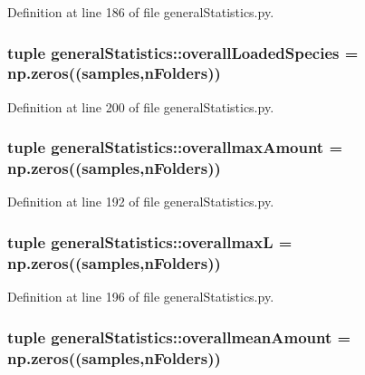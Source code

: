 \-Definition at line 186 of file general\-Statistics.\-py.

\hypertarget{namespacegeneral_statistics_ada024998af2caa201a94d7a571747842}{
\subsubsection[{overall\-Loaded\-Species}]{\setlength{\rightskip}{0pt plus 5cm}tuple {\bf general\-Statistics\-::overall\-Loaded\-Species} = np.\-zeros(({\bf samples},{\bf n\-Folders}))}}\label{namespacegeneral_statistics_ada024998af2caa201a94d7a571747842}


\-Definition at line 200 of file general\-Statistics.\-py.

\hypertarget{namespacegeneral_statistics_aca7914003b583bc82be1810eb5316e0e}{
\subsubsection[{overallmax\-Amount}]{\setlength{\rightskip}{0pt plus 5cm}tuple {\bf general\-Statistics\-::overallmax\-Amount} = np.\-zeros(({\bf samples},{\bf n\-Folders}))}}\label{namespacegeneral_statistics_aca7914003b583bc82be1810eb5316e0e}


\-Definition at line 192 of file general\-Statistics.\-py.

\hypertarget{namespacegeneral_statistics_a611c6d1d277f96f931197de89b125c88}{
\subsubsection[{overallmax\-L}]{\setlength{\rightskip}{0pt plus 5cm}tuple {\bf general\-Statistics\-::overallmax\-L} = np.\-zeros(({\bf samples},{\bf n\-Folders}))}}\label{namespacegeneral_statistics_a611c6d1d277f96f931197de89b125c88}


\-Definition at line 196 of file general\-Statistics.\-py.

\hypertarget{namespacegeneral_statistics_a1ef9cf11c214d55261a4911942c1a1f4}{
\subsubsection[{overallmean\-Amount}]{\setlength{\rightskip}{0pt plus 5cm}tuple {\bf general\-Statistics\-::overallmean\-Amount} = np.\-zeros(({\bf samples},{\bf n\-Folders}))}}\label{namespacegeneral_statistics_a1ef9cf11c214d55261a4911942c1a1f4}


